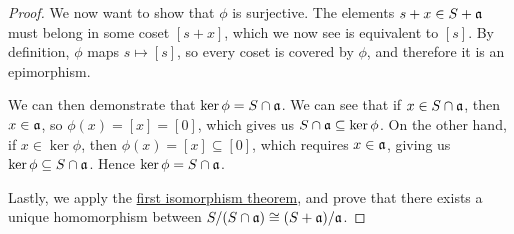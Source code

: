 \begin{proof}
    We now want to show that \(\phi\) is surjective.
    The elements \(s+x \in S+\mathfrak{a}\) must belong in some coset \([s+x]\),
    which we now see is equivalent to \([s]\).
    By definition, \(\phi\) maps \(s \mapsto [s]\),
    so every coset is covered by \(\phi\),
    and therefore it is an epimorphism.

    We can then demonstrate that \(\ker\phi = S \cap \mathfrak{a}\).
    We can see that if \(x \in S \cap \mathfrak{a}\),
    then \(x \in \mathfrak{a}\), so \(\phi(x) = [x] = [0]\),
    which gives us \(S \cap \mathfrak{a} \subseteq \ker\phi\).
    On the other hand, if \(x \in \ker\phi\),
    then \(\phi(x) = [x] \subseteq [0]\),
    which requires \(x \in \mathfrak{a}\), giving us \(\ker\phi \subseteq S \cap \mathfrak{a}\).
    Hence \(\ker\phi = S \cap \mathfrak{a}\).

    Lastly, we apply the \hyperref[thm:iso-2-ring]{first isomorphism theorem},
    and prove that there exists a unique homomorphism
    between \(S/(S \cap \mathfrak{a}) \cong (S+\mathfrak{a})/\mathfrak{a}\).
\end{proof}

